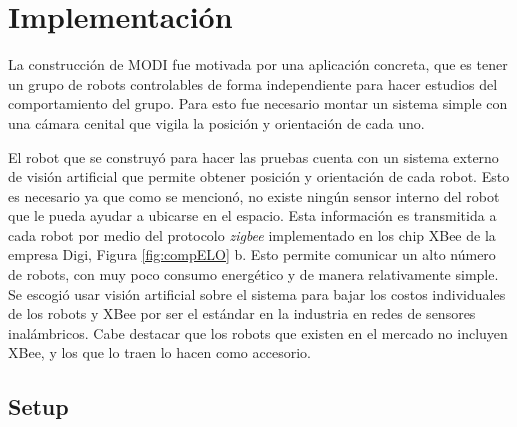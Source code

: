 \section{Implementación}
La construcción de MODI fue motivada por una aplicación concreta, que es tener un grupo de robots controlables de forma independiente para hacer estudios del comportamiento del grupo. Para esto fue necesario montar un sistema simple con una cámara cenital que vigila  la posición y orientación de cada uno.

El robot que se construyó para hacer las pruebas cuenta con un sistema externo de visión artificial que permite obtener posición y orientación de cada robot. Esto es necesario ya que como se mencionó, no existe ningún sensor interno del robot que le pueda ayudar a ubicarse en el espacio. Esta información es transmitida a cada robot por medio del protocolo \textit{zigbee} implementado en los chip XBee de la empresa Digi, Figura \ref{fig:compELO} b. Esto permite comunicar un alto número de robots, con muy poco consumo energético y de manera relativamente simple. Se escogió usar visión artificial sobre el sistema para bajar los costos individuales de los robots y XBee por ser el estándar en la industria en redes de sensores inalámbricos. Cabe destacar que los robots que existen en el mercado no incluyen XBee, y los que lo traen lo hacen como accesorio. 

\subsection{Setup}

